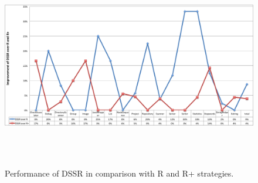 \begin{figure}[ht]
\centering
\includegraphics[width=15.5cm,height=9cm]{chapter4/DssrImprove.png}
\caption{Performance of DSSR in comparison with R and R+ strategies.}
\label{fig:LineChart}
\end{figure}




